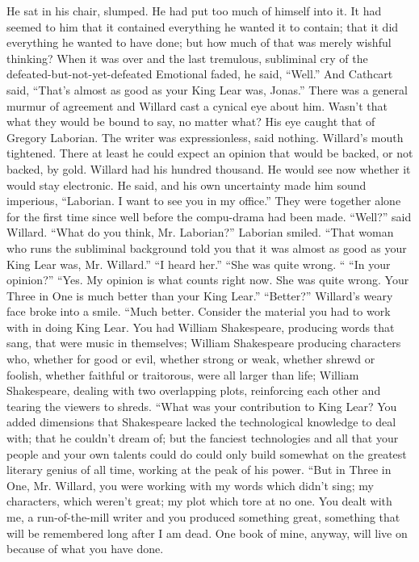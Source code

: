\documentclass[a4paper,12pt]{article}
\begin{document}
He sat in his chair, slumped. He had put too much of himself into it. It had seemed to him that it
contained everything he wanted it to contain; that it did everything he wanted to have done; but how much
of that was merely wishful thinking?
When it was over and the last tremulous, subliminal cry of the defeated-but-not-yet-defeated
Emotional faded, he said, “Well.”
And Cathcart said, “That’s almost as good as your King Lear was, Jonas.”
There was a general murmur of agreement and Willard cast a cynical eye about him. Wasn’t that
what they would be bound to say, no matter what?
His eye caught that of Gregory Laborian. The writer was expressionless, said nothing.
Willard’s mouth tightened. There at least he could expect an opinion that would be backed, or not
backed, by gold. Willard had his hundred thousand. He would see now whether it would stay electronic.
He said, and his own uncertainty made him sound imperious, “Laborian. I want to see you in my
office.”
They were together alone for the first time since well before the compu-drama had been made.
“Well?” said Willard. “What do you think, Mr. Laborian?”
Laborian smiled. “That woman who runs the subliminal background told you that it was almost as
good as your King Lear was, Mr. Willard.”
“I heard her.”
“She was quite wrong. “
“In your opinion?”
“Yes. My opinion is what counts right now. She was quite wrong. Your Three in One is much
better than your King Lear.”
“Better?” Willard’s weary face broke into a smile.
“Much better. Consider the material you had to work with in doing King Lear. You had William
Shakespeare, producing words that sang, that were music in themselves; William Shakespeare producing
characters who, whether for good or evil, whether strong or weak, whether shrewd or foolish, whether
faithful or traitorous, were all larger than life; William Shakespeare, dealing with two overlapping plots,
reinforcing each other and tearing the viewers to shreds.
“What was your contribution to King Lear? You added dimensions that Shakespeare lacked the
technological knowledge to deal with; that he couldn’t dream of; but the fanciest technologies and all that
your people and your own talents could do could only build somewhat on the greatest literary genius of all
time, working at the peak of his power.
“But in Three in One, Mr. Willard, you were working with my words which didn’t sing; my
characters, which weren’t great; my plot which tore at no one. You dealt with me, a run-of-the-mill writer
and you produced something great, something that will be remembered long after I am dead. One book of
mine, anyway, will live on because of what you have done.
\end{document}
